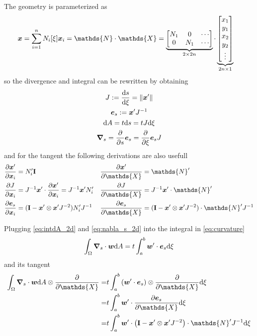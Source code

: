 \documentclass[a4paper,11pt]{article}
\renewcommand{\to}[1]{\text{\boldmath $#1$}} %
\newcommand{\ts}[1]{\text{\boldmath $\mathrm{#1}$}} %
\newcommand{\uv}[1]{\mathds{#1}}
\newcommand{\um}[1]{\mathds{#1}}
\newcommand{\intd}[1]{\mathrm{d}#1}
\newcommand{\pderiv}[2]{\frac{\partial#1}{\partial#2}}
\newcommand{\dderiv}[2]{\frac{\mathrm{d}#1}{\mathrm{d}#2}}
\newcommand{\norm}[1]{\left\lVert{#1}\right\rVert}
\newcommand{\defeq}{:=}
\begin{document}
The geometry is parameterized as
\begin{align}
 \to x &= \sum_{i=1}^n N_i[\xi]\to x_i
  = \um N \cdot \uv X
  = \underbrace{\begin{bmatrix}N_1 & 0 & \cdots\\ 0 & N_1 & \cdots \end{bmatrix}}_{2\times 2n}\cdot \underbrace{\begin{bmatrix}x_1\\y_1\\x_2\\y_2\\ \vdots\end{bmatrix}}_{2n\times 1}
\end{align}
so the divergence and integral can be rewritten by obtaining
\begin{gather}
 J \defeq \dderiv{s}{\xi} = \norm{\to x'}\\
 \to e_s \defeq \to x' J^{-1}\\
 \intd A = t \intd s = t J \intd \xi     \label{eq:intdA_2d}\\
 \to \nabla_s = \pderiv{}{s}\to e_s = \pderiv{}{\xi}\to e_s J    \label{eq:nabla_s_2d}
\end{gather}
and for the tangent the following derivations are also usefull
\begin{align}
 \pderiv{\to x'}{\to x_i} &= N_i' \ts I & \pderiv{\to x'}{\uv X} &= \um N'\\
 \pderiv{J}{\to x_i} &= J^{-1} \to x'\cdot \pderiv{\to x'}{\to x_i} = J^{-1} \to x'N_i'  & \pderiv{J}{\uv X} &= J^{-1} \to x'\cdot \um N' \\
 \pderiv{\to e_s}{\to x_i} &= (\ts I - \to x'\otimes\to x' J^{-2})N_i' J^{-1} &  \pderiv{\to e_s}{\uv X} &= (\ts I - \to x'\otimes \to x'J^{-2})\cdot \um N' J^{-1}
\end{align}

Plugging \eqref{eq:intdA_2d} and \eqref{eq:nabla_s_2d} into the integral in \eqref{eq:curvature}
\begin{align}
 \int_\Omega\to \nabla_s\cdot\to w\intd A &= t \int_a^b \to w'\cdot \to e_s \intd\xi\\
\end{align}
and its tangent
\begin{align}
 \int_\Omega\to \nabla_s\cdot\to w\intd A \otimes \pderiv{}{\uv X}
 =&t \int_a^b \left(\to w'\cdot \to e_s\right)\otimes \pderiv{}{\uv X}  \intd\xi\\
 =&t \int_a^b \to w'\cdot \pderiv{\to e_s}{\uv X} \intd\xi\\
 =&t \int_a^b \to w'\cdot \left(\ts I-\to x'\otimes\to x' J^{-2}\right)\cdot \um N' J^{-1} \intd\xi
\end{align}
\end{document}
